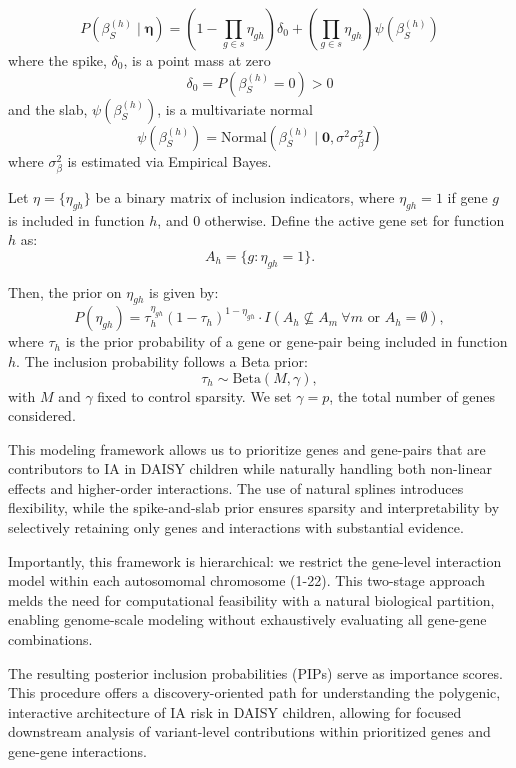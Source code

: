 \documentclass{article}\usepackage[]{graphicx}\usepackage[]{color}
\begin{document}
\begin{equation}
P(\beta_S^{(h)} \mid \mathbf{\eta}) = (1- \prod_{g \in s} \eta_{gh})\delta_0 + (\prod_{g\in s}\eta_{gh})\psi(\beta_S^{(h)})
\end{equation}
where the spike, $\delta_0$, is a point mass at zero
\begin{equation}
\delta_0 = P(\beta_S^{(h)} = 0)>0
\end{equation}
and the slab, $\psi(\beta_S^{(h)})$, is a multivariate normal
\begin{equation}
\psi(\beta_S^{(h)}) = \text{Normal}(\beta_S^{(h)} \mid \mathbf{0}, \sigma^2\sigma^2_{\beta}I)
\end{equation}
where $\sigma^2_{\beta}$ is estimated via Empirical Bayes.
\par
Let $\eta = \{\eta_{gh}\}$ be a binary matrix of inclusion indicators, where $\eta_{gh} = 1$ if gene $g$ is included in function $h$, and 0 otherwise. Define the active gene set for function $h$ as:
\begin{equation}
A_h = \{g : \eta_{gh}=1\}.
\end{equation}

Then, the prior on $\eta_{gh}$ is given by:
\begin{equation}
P(\eta_{gh}) = \tau_h^{\eta_{gh}}(1-\tau_h)^{1-\eta_{gh}} \cdot I\left(A_h \not\subseteq A_m \ \forall m \text{ or } A_h = \emptyset\right),
\end{equation}
where $\tau_h$ is the prior probability of a gene or gene-pair being included in function $h$. The inclusion probability follows a Beta prior:
\begin{equation}
\tau_h \sim \text{Beta}(M, \gamma),
\end{equation}
with $M$ and $\gamma$ fixed to control sparsity. We set $\gamma = p$, the total number of genes considered.
\par
This modeling framework allows us to prioritize genes and gene-pairs that are contributors to IA in DAISY children while naturally handling both non-linear effects and higher-order interactions. The use of natural splines introduces flexibility, while the spike-and-slab prior ensures sparsity and interpretability by selectively retaining only genes and interactions with substantial evidence.
\par
Importantly, this framework is hierarchical: we restrict the gene-level interaction model within each autosomomal chromosome (1-22). This two-stage approach melds the need for computational feasibility with a natural biological partition, enabling genome-scale modeling without exhaustively evaluating all gene-gene combinations.
\par
The resulting posterior inclusion probabilities (PIPs) serve as importance scores. This procedure offers a discovery-oriented path for understanding the polygenic, interactive architecture of IA risk in DAISY children, allowing for focused downstream analysis of variant-level contributions within prioritized genes and gene-gene interactions.
\end{document}
